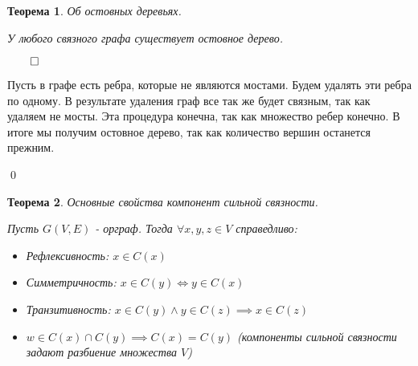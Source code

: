 \documentclass[a4paper,12pt,leqno]{article}
\theoremstyle{plain} %
\newtheorem{theorem}{Теорема}
\theoremstyle{definition} %
\renewenvironment{proof}{$\qed$}{{\qed}} %
\begin{document}
\begin{theorem}\textit{Об остовных деревьях.}

У любого связного графа существует остовное дерево.

\end{theorem}

\begin{proof}

Пусть в графе есть ребра, которые не являются мостами. Будем удалять эти ребра по одному. В результате удаления граф все так же будет связным, так как удаляем не мосты. Эта процедура конечна, так как множество ребер конечно. В итоге мы получим остовное дерево, так как количество вершин останется прежним.

\end{proof}

\begin{theorem}\textit{Основные свойства компонент сильной связности.}

Пусть $G(V, E)$ - орграф. Тогда $\forall x, y, z \in V$ справедливо:

\begin{itemize}
    \item Рефлексивность: $x \in C(x)$
    
    \item Симметричность: $x \in C(y) \iff y \in C(x)$
    
    \item Транзитивность: $x \in C(y) \wedge y \in C(z) \implies x \in C(z)$
    
    \item $w \in C(x) \cap C(y) \implies C(x) = C(y)$ (компоненты сильной связности задают разбиение множества $V$)
\end{itemize}

\end{theorem}
\end{document}
